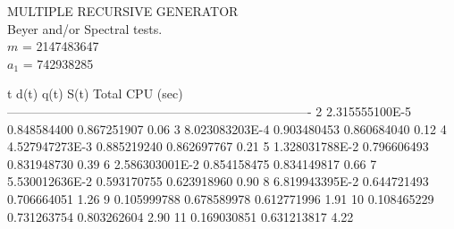 MULTIPLE RECURSIVE GENERATOR\\
Beyer and/or Spectral tests.\\

 $m$   =           2147483647\\
 $a_1$ =            742938285\\


\code

    t           d(t)            q(t)           S(t)        Total CPU (sec)
 -------------------------------------------------------------------------
    2     2.315555100E-5    0.848584400    0.867251907           0.06
    3     8.023083203E-4    0.903480453    0.860684040           0.12
    4     4.527947273E-3    0.885219240    0.862697767           0.21
    5     1.328031788E-2    0.796606493    0.831948730           0.39
    6     2.586303001E-2    0.854158475    0.834149817           0.66
    7     5.530012636E-2    0.593170755    0.623918960           0.90
    8     6.819943395E-2    0.644721493    0.706664051           1.26
    9        0.105999788    0.678589978    0.612771996           1.91
   10        0.108465229    0.731263754    0.803262604           2.90
   11        0.169030851    0.631213817                          4.22
